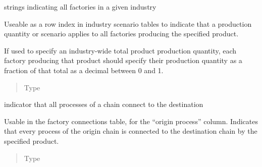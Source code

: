 \documentclass[a4paper,10pt,english]{sphinxmanual}
\begin{document}
\begin{fulllineitems}
\label{\detokenize{dataconfig:dataconfig.all_factories}}
strings indicating all factories in a given industry

Useable as a row index in industry scenario tables to indicate that a
production quantity or scenario applies to all factories producing the
specified product.

If used to specify an industry-wide total product production quantity,
each factory producing that product should specify their production quantity
as a fraction of that total as a decimal between 0 and 1.
\begin{quote}\begin{description}
\item[{Type}] \leavevmode
{}

\end{description}\end{quote}

\end{fulllineitems}


\begin{fulllineitems}
\label{\detokenize{dataconfig:dataconfig.connect_all}}
indicator that all processes of a chain connect to the destination

Usable in the factory connections table, for the “origin process” column.
Indicates that  every process of the origin chain is connected to the
destination chain by the specified product.
\begin{quote}\begin{description}
\item[{Type}] \leavevmode
{}

\end{description}\end{quote}

\end{fulllineitems}

\end{document}
